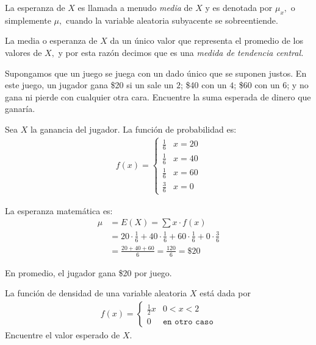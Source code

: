  La esperanza de $X$ es llamada a menudo \emph{media} de $X$ y es denotada por $\mu_{x},$ o simplemente $\mu,$ cuando la variable aleatoria subyacente se sobreentiende.


 La media o esperanza de $X$ da un único valor que representa el promedio de los valores de $X,$ y por esta razón decimos que es una \emph{medida de tendencia central.}



 \begin{ejemplo}
  \label{exmp:2.9.1}
  Supongamos que un juego se juega con un dado único que se suponen justos. En este juego, un jugador gana \$20 si un sale un $2$; \$40 con un $4$; \$60 con un $6$; y no gana ni pierde con cualquier otra cara. Encuentre la suma esperada de dinero que ganaría.
 \end{ejemplo}

\begin{solucion}
	Sea $X$ la ganancia del jugador. La función de probabilidad es:
	\begin{align}
		f(x) = \begin{cases}
			\frac{1}{6} & x = 20 \\
			\frac{1}{6} & x = 40 \\
			\frac{1}{6} & x = 60 \\
			\frac{3}{6} & x = 0
		\end{cases}
	\end{align}
	
	La esperanza matemática es:
	\begin{align}
		\mu &= E(X) = \sum x \cdot f(x) \\
		&= 20 \cdot \frac{1}{6} + 40 \cdot \frac{1}{6} + 60 \cdot \frac{1}{6} + 0 \cdot \frac{3}{6} \\
		&= \frac{20 + 40 + 60}{6} = \frac{120}{6} = \$20
	\end{align}
	
	En promedio, el jugador gana \$20 por juego.
\end{solucion}






 \begin{ejemplo}
  \label{exmp:2.9.2}
  La función de densidad de una variable aleatoria $X$ está dada por
  \begin{align}
   f(x)=
   \begin{cases}
    \frac{1}{2}x & 0<x<2 \\
    0 & \texttt{en otro caso}
   \end{cases}
  \end{align}
Encuentre el valor esperado de $X.$
 \end{ejemplo}



